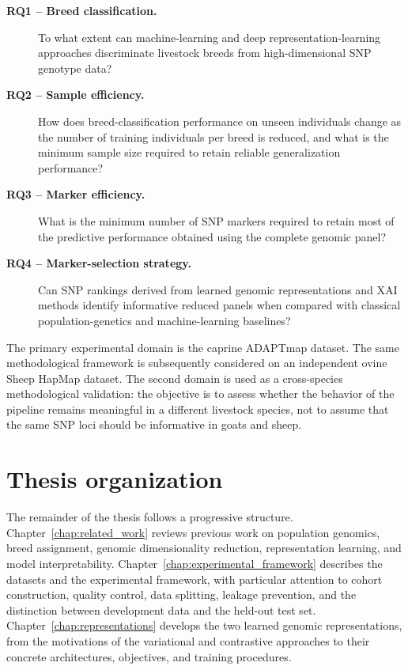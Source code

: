 \begin{description}

    \item[\textbf{RQ1 -- Breed classification.}]
    To what extent can machine-learning and deep
    representation-learning approaches discriminate livestock breeds
    from high-dimensional SNP genotype data?

    \item[\textbf{RQ2 -- Sample efficiency.}]
    How does breed-classification performance on unseen individuals
    change as the number of training individuals per breed is reduced,
    and what is the minimum sample size required to retain reliable
    generalization performance?

    \item[\textbf{RQ3 -- Marker efficiency.}]
    What is the minimum number of SNP markers required to retain most
    of the predictive performance obtained using the complete genomic
    panel?

    \item[\textbf{RQ4 -- Marker-selection strategy.}]
    Can SNP rankings derived from learned genomic representations and
    XAI methods identify informative reduced panels when compared with
    classical population-genetics and machine-learning baselines?

\end{description}

The primary experimental domain is the caprine ADAPTmap dataset. The
same methodological framework is subsequently considered on an
independent ovine Sheep HapMap dataset. The second domain is used as a
cross-species methodological validation: the objective is to assess
whether the behavior of the pipeline remains meaningful in a different
livestock species, not to assume that the same SNP loci should be
informative in goats and sheep.

\section{Thesis organization}
\label{sec:thesis_organization}

The remainder of the thesis follows a progressive structure.
Chapter~\ref{chap:related_work} reviews previous work on population
genomics, breed assignment, genomic dimensionality reduction,
representation learning, and model interpretability.
Chapter~\ref{chap:experimental_framework} describes the datasets and
the experimental framework, with particular attention to cohort
construction, quality control, data splitting, leakage prevention, and
the distinction between development data and the held-out test set.
Chapter~\ref{chap:representations} develops the two learned genomic
representations, from the motivations of the variational and
contrastive approaches to their concrete architectures, objectives,
and training procedures.

